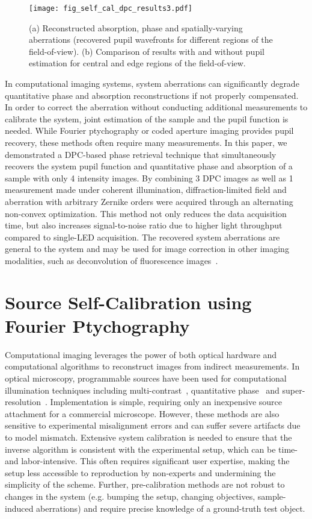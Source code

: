 \begin{figure}[ht!]
\centering\texttt{[image: fig\_self\_cal\_dpc\_results3.pdf]}
\caption{\label{fig:self_cal_dpc_experimentalresults3} (a) Reconstructed absorption, phase and spatially-varying aberrations (recovered pupil wavefronts for different regions of the field-of-view). (b) Comparison of results with and without pupil estimation for central and edge regions of the field-of-view.}
\end{figure}

In computational imaging systems, system aberrations can significantly degrade quantitative phase and absorption reconstructions if not properly compensated. In order to correct the aberration without conducting additional measurements to calibrate the system, joint estimation of the sample and the pupil function is needed. While Fourier ptychography or coded aperture imaging provides pupil recovery, these methods often require many measurements. In this paper, we demonstrated a DPC-based phase retrieval technique that simultaneously recovers the system pupil function and quantitative phase and absorption of a sample with only 4 intensity images. By combining 3 DPC images as well as 1 measurement made under coherent illumination, diffraction-limited field and aberration with arbitrary Zernike orders were acquired through an alternating non-convex optimization. This method not only reduces the data acquisition time, but also increases signal-to-noise ratio due to higher light throughput compared to single-LED acquisition. The recovered system aberrations are general to the system and may be used for image correction in other imaging modalities, such as deconvolution of fluorescence images~\cite{Chung2016}.

\section{Source Self-Calibration using Fourier Ptychography}\label{sec:selfcal:fpm}

Computational imaging leverages the power of both optical hardware and computational algorithms to reconstruct images from indirect measurements. In optical microscopy, programmable sources have been used for computational illumination techniques including multi-contrast~\cite{Zheng2011,Liu2014}, quantitative phase~\cite{Zheng2013,Tian14,tian2015quantitative,Chen2016} and super-resolution~\cite{Zheng2013,ou2013quantitative,Dong:14,Tian2014}. Implementation is simple, requiring only an inexpensive source attachment for a commercial microscope. However, these methods are also sensitive to experimental misalignment errors and can suffer severe artifacts due to model mismatch. Extensive system calibration is needed to ensure that the inverse algorithm is consistent with the experimental setup, which can be time- and labor-intensive. This often requires significant user expertise, making the setup less accessible to reproduction by non-experts and undermining the simplicity of the scheme. Further, pre-calibration methods are not robust to changes in the system (e.g. bumping the setup, changing objectives, sample-induced aberrations) and require precise knowledge of a ground-truth test object.

